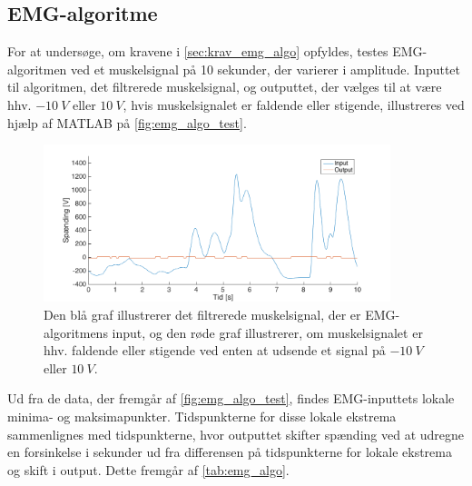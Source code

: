 \subsection{EMG-algoritme}
For at undersøge, om kravene i \autoref{sec:krav_emg_algo} opfyldes, testes EMG-algoritmen ved et muskelsignal på 10 sekunder, der varierer i amplitude. Inputtet til algoritmen, det filtrerede muskelsignal, og outputtet, der vælges til at være hhv. $-10~V$ eller $10~V$, hvis muskelsignalet er faldende eller stigende, illustreres ved hjælp af MATLAB på \autoref{fig:emg_algo_test}. 

\begin{figure}[H]
\centering
\includegraphics[width=0.9\textwidth]{figures/EMG_algo_test}
\caption{Den blå graf illustrerer det filtrerede muskelsignal, der er EMG-algoritmens input, og den røde graf illustrerer, om muskelsignalet er hhv. faldende eller stigende ved enten at udsende et signal på $-10~V$ eller $10~V$.}
\label{fig:emg_algo_test}
\end{figure}

\noindent
Ud fra de data, der fremgår af \autoref{fig:emg_algo_test}, findes EMG-inputtets lokale minima- og maksimapunkter. Tidspunkterne for disse lokale ekstrema sammenlignes med tidspunkterne, hvor outputtet skifter spænding ved at udregne en forsinkelse i sekunder ud fra differensen på tidspunkterne for lokale ekstrema og skift i output. Dette fremgår af \autoref{tab:emg_algo}. 

